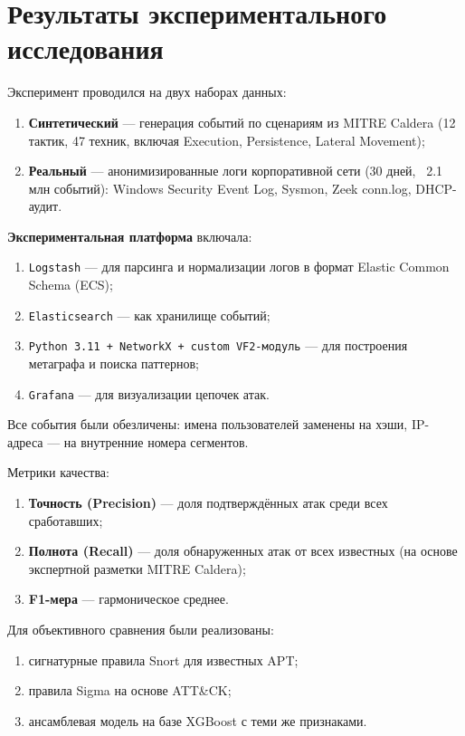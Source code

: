 \section*{Результаты экспериментального исследования}

Эксперимент проводился на двух наборах данных:
\begin{enumerate}
    \item \textbf{Синтетический} — генерация событий по сценариям из MITRE Caldera (12 тактик, 47 техник, включая Execution, Persistence, Lateral Movement);
    \item \textbf{Реальный} — анонимизированные логи корпоративной сети (30 дней, ~2.1 млн событий): Windows Security Event Log, Sysmon, Zeek conn.log, DHCP-аудит.
\end{enumerate}

\textbf{Экспериментальная платформа} включала:
\begin{enumerate}
    \item \texttt{Logstash} — для парсинга и нормализации логов в формат Elastic Common Schema (ECS);
    \item \texttt{Elasticsearch} — как хранилище событий;
    \item \texttt{Python 3.11 + NetworkX + custom VF2-модуль} — для построения метаграфа и поиска паттернов;
    \item \texttt{Grafana} — для визуализации цепочек атак.
\end{enumerate}

Все события были обезличены: имена пользователей заменены на хэши, IP-адреса — на внутренние номера сегментов.

Метрики качества:
\begin{enumerate}
    \item \textbf{Точность (Precision)} — доля подтверждённых атак среди всех сработавших;
    \item \textbf{Полнота (Recall)} — доля обнаруженных атак от всех известных (на основе экспертной разметки MITRE Caldera);
    \item \textbf{F1-мера} — гармоническое среднее.
\end{enumerate}

Для объективного сравнения были реализованы:
\begin{enumerate}
    \item сигнатурные правила Snort для известных APT;
    \item правила Sigma на основе ATT\&CK;
    \item ансамблевая модель на базе XGBoost с теми же признаками.
\end{enumerate}

